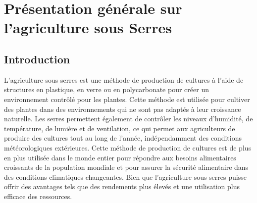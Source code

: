 \chapter{Présentation générale sur l’agriculture sous Serres} \label{chap:Présentation générale sur l’agriculture sous Serres}

\section{Introduction}
L'agriculture sous serres est une méthode de production de cultures à l'aide de structures en plastique, en verre ou en polycarbonate pour créer un environnement contrôlé pour les plantes. Cette méthode est utilisée pour cultiver des plantes dans des environnements qui ne sont pas adaptés à leur croissance naturelle.
Les serres permettent également de contrôler les niveaux d'humidité, de température, de lumière et de ventilation, ce qui permet aux agriculteurs de produire des cultures tout au long de l'année, indépendamment des conditions météorologiques extérieures. Cette méthode de production de cultures est de plus en plus utilisée dans le monde entier pour répondre aux besoins alimentaires croissants de la population mondiale et pour assurer la sécurité alimentaire dans des conditions climatiques changeantes.
Bien que l'agriculture sous serres puisse offrir des avantages tels que des rendements plus élevés et une utilisation plus efficace des ressources.

